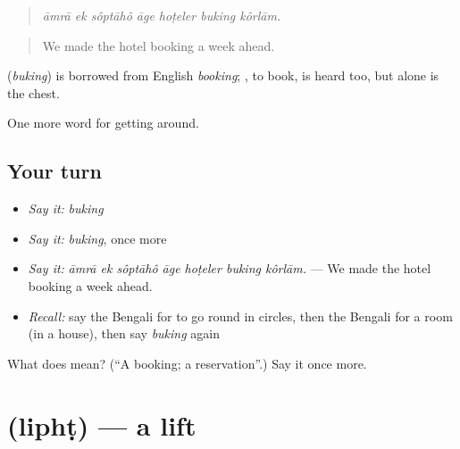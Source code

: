 \begin{quote}
      
\end{quote}

\begin{quote}
\emph{āmrā ek sôptāhô āge hoṭeler buking kôrlām.}
\end{quote}

\begin{quote}
We made the hotel booking a week ahead.
\end{quote}

\begin{cousinweb}
\textbf{} (\emph{buking}) is borrowed from English \emph{booking};  , to book, is heard too, but  alone is the chest.
\end{cousinweb}

\begin{grammarlens}[title={What you've built}]
One more word for getting around.
\end{grammarlens}

\subsection*{Your turn}
\begin{itemize}
\raggedright
  \item \emph{Say it:} \emph{buking}
  \item \emph{Say it:} \emph{buking}, once more
  \item \emph{Say it:} \emph{āmrā ek sôptāhô āge hoṭeler buking kôrlām.} — We made the hotel booking a week ahead.
  \item \emph{Recall:} say the Bengali for to go round in circles, then the Bengali for a room (in a house), then say \emph{buking} again
\end{itemize}

\begin{tcolorbox}[breakable,colback=teal!4,colframe=teal!35!black,title={Before you move on}]
What does  mean? (\textquotedblleft{}A booking; a reservation\textquotedblright{}.) Say it once more.
\end{tcolorbox}
\section[\texorpdfstring{\bn{লিফট} (liphṭ)}{লিফট (liphṭ)}]{ (liphṭ) — a lift}

\label{lesson:BN-C403-lipht}



